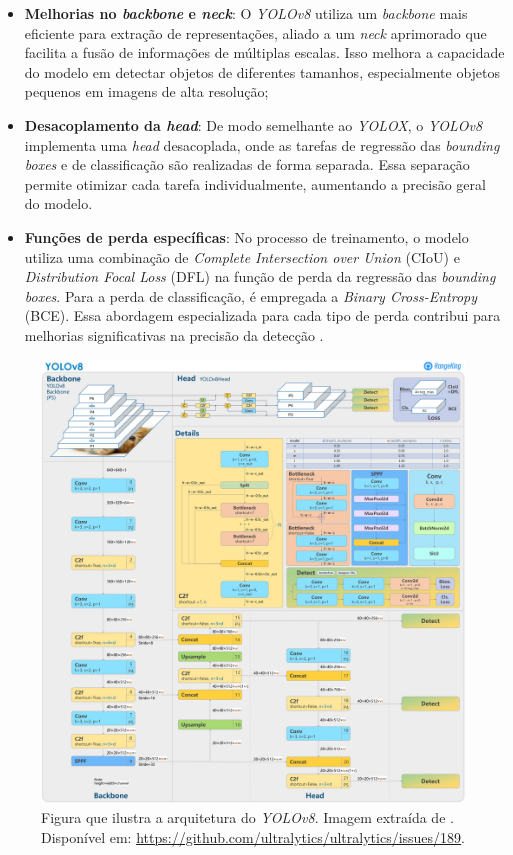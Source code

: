 \begin{itemize} 
    \item \textbf{Melhorias no \emph{backbone} e \emph{neck}}: O \emph{YOLOv8} utiliza um \emph{backbone} mais eficiente para extração de representações, aliado a um \emph{neck} aprimorado que facilita a fusão de informações de múltiplas escalas. Isso melhora a capacidade do modelo em detectar objetos de diferentes tamanhos, especialmente objetos pequenos em imagens de alta resolução;

    \item \textbf{Desacoplamento da \emph{head}}: De modo semelhante ao \emph{YOLOX}, o \emph{YOLOv8} implementa uma \emph{head} desacoplada, onde as tarefas de regressão das \emph{bounding boxes} e de classificação são realizadas de forma separada. Essa separação permite otimizar cada tarefa individualmente, aumentando a precisão geral do modelo.

    \item \textbf{Funções de perda específicas}: No processo de treinamento, o modelo utiliza uma combinação de \emph{Complete Intersection over Union} (CIoU) \citep{Zheng2020} e \emph{Distribution Focal Loss} (DFL) \citep{Li2020} na função de perda da regressão das \emph{bounding boxes}. Para a perda de classificação, é empregada a \emph{Binary Cross-Entropy} (BCE). Essa abordagem especializada para cada tipo de perda contribui para melhorias significativas na precisão da detecção \citep{yolo_review}.
\end{itemize}
\begin{figure}[htb!]
    \centering
    \includegraphics[width=0.8\linewidth]{images/yolov8.jpg}
    \caption{\label{fig:yolov8_issue189} Figura que ilustra a arquitetura do \emph{YOLOv8}. Imagem extraída de \citeauthor{ultralytics_issue_189}. Disponível em: \url{https://github.com/ultralytics/ultralytics/issues/189}.}
\end{figure}

